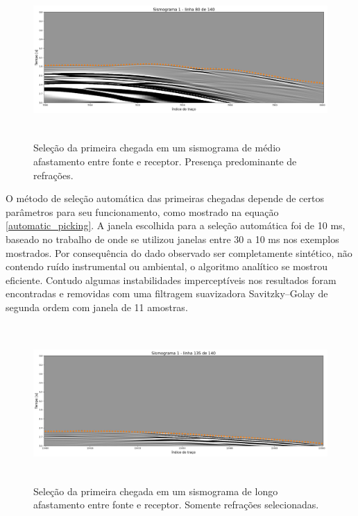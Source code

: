 \begin{figure}[H]
	\centering
	\includegraphics[width=16cm,height=6cm]{Imgs/Metodologia/linha80_sismo1.png}
	\caption{Seleção da primeira chegada em um sismograma de médio afastamento entre fonte e receptor. Presença predominante de refrações.}
	\label{fig:gather_picking_mid}	
\end{figure}

O método de seleção automática das primeiras chegadas depende de certos parâmetros para seu funcionamento, como mostrado na equação \ref{automatic_picking}. A janela escolhida para a seleção automática foi de 10 ms, baseado no trabalho de  onde se utilizou janelas entre 30 a 10 ms nos exemplos mostrados. Por consequência do dado observado ser completamente sintético, não contendo ruído instrumental ou ambiental, o algoritmo analítico se mostrou eficiente. Contudo algumas instabilidades imperceptíveis nos resultados foram encontradas e removidas com uma filtragem suavizadora Savitzky–Golay de segunda ordem com janela de 11 amostras.   

\begin{figure}[H]
	\centering
	\includegraphics[width=16cm,height=6cm]{Imgs/Metodologia/linha135_sismo1.png}
	\caption{Seleção da primeira chegada em um sismograma de longo afastamento entre fonte e receptor. Somente refrações selecionadas.}
	\label{fig:gather_picking_far}	
\end{figure}

